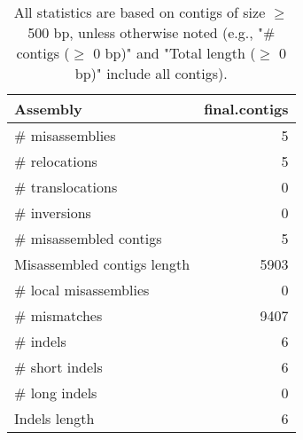 \documentclass[12pt,a4paper]{article}
\begin{document}
\begin{table}[ht]
\begin{center}
\caption{All statistics are based on contigs of size $\geq$ 500 bp, unless otherwise noted (e.g., "\# contigs ($\geq$ 0 bp)" and "Total length ($\geq$ 0 bp)" include all contigs).}
\begin{tabular}{|l*{1}{|r}|}
\hline
Assembly & final.contigs \\ \hline
\# misassemblies & 5 \\ \hline
\hspace{5mm}\# relocations & 5 \\ \hline
\hspace{5mm}\# translocations & 0 \\ \hline
\hspace{5mm}\# inversions & 0 \\ \hline
\# misassembled contigs & 5 \\ \hline
Misassembled contigs length & 5903 \\ \hline
\# local misassemblies & 0 \\ \hline
\# mismatches & 9407 \\ \hline
\# indels & 6 \\ \hline
\hspace{5mm}\# short indels & 6 \\ \hline
\hspace{5mm}\# long indels & 0 \\ \hline
Indels length & 6 \\ \hline
\end{tabular}
\end{center}
\end{table}
\end{document}
